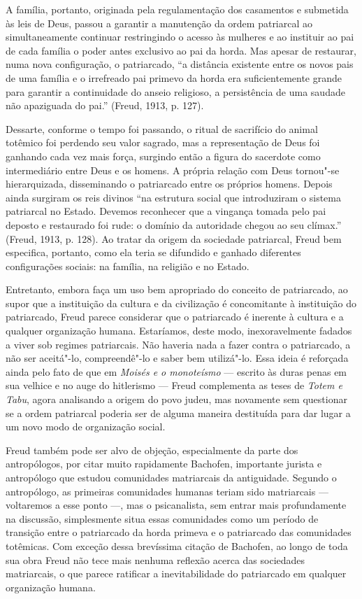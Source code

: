 A família, portanto, originada pela regulamentação dos casamentos e
submetida às leis de Deus, passou a garantir a manutenção da ordem
patriarcal ao simultaneamente continuar restringindo o acesso às
mulheres e ao instituir ao pai de cada família o poder antes exclusivo
ao pai da horda. Mas apesar de restaurar, numa nova configuração, o
patriarcado, ``a distância existente entre os novos pais de uma família
e o irrefreado pai primevo da horda era suficientemente grande para
garantir a continuidade do anseio religioso, a persistência de uma
saudade não apaziguada do pai.'' (Freud, 1913, p. 127).

Dessarte, conforme o tempo foi passando, o ritual de sacrifício do
animal totêmico foi perdendo seu valor sagrado, mas a representação de
Deus foi ganhando cada vez mais força, surgindo então a figura do
sacerdote como intermediário entre Deus e os homens. A própria relação
com Deus tornou"-se hierarquizada, disseminando o patriarcado entre os
próprios homens. Depois ainda surgiram os reis divinos ``na estrutura
social que introduziram o sistema patriarcal no Estado. Devemos
reconhecer que a vingança tomada pelo pai deposto e restaurado foi rude:
o domínio da autoridade chegou ao seu clímax.'' (Freud, 1913, p. 128).
Ao tratar da origem da sociedade patriarcal, Freud bem especifica,
portanto, como ela teria se difundido e ganhado diferentes configurações
sociais: na família, na religião e no Estado.

Entretanto, embora faça um uso bem apropriado do conceito de
patriarcado, ao supor que a instituição da cultura e da civilização é
concomitante à instituição do patriarcado, Freud parece considerar que o
patriarcado é inerente à cultura e a qualquer organização humana.
Estaríamos, deste modo, inexoravelmente fadados a viver sob regimes
patriarcais. Não haveria nada a fazer contra o patriarcado, a não ser
aceitá"-lo, compreendê"-lo e saber bem utilizá"-lo. Essa ideia é reforçada
ainda pelo fato de que em \emph{Moisés e o monoteísmo} --- escrito às
duras penas em sua velhice e no auge do hitlerismo --- Freud complementa
as teses de \emph{Totem e Tabu}, agora analisando a origem do povo
judeu, mas novamente sem questionar se a ordem patriarcal poderia ser de
alguma maneira destituída para dar lugar a um novo modo de organização
social.

Freud também pode ser alvo de objeção, especialmente da parte dos
antropólogos, por citar muito rapidamente Bachofen, importante jurista e
antropólogo que estudou comunidades matriarcais da antiguidade. Segundo
o antropólogo, as primeiras comunidades humanas teriam sido matriarcais
--- voltaremos a esse ponto ---, mas o psicanalista, sem entrar mais
profundamente na discussão, simplesmente situa essas comunidades como um
período de transição entre o patriarcado da horda primeva e o
patriarcado das comunidades totêmicas. Com exceção dessa brevíssima
citação de Bachofen, ao longo de toda sua obra Freud não tece mais
nenhuma reflexão acerca das sociedades matriarcais, o que parece
ratificar a inevitabilidade do patriarcado em qualquer organização
humana.

